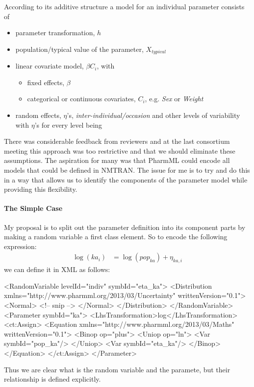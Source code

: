 \documentclass[a4paper,11pt]{article}
\newcommand{\pharmml}{PharmML\xspace}
\begin{document}
According to its additive structure a model for an individual parameter consists of
\begin{itemize}
\item
parameter transformation, $h$
\item
population/typical value of the parameter, $X_{typical}$
\item
linear covariate model, $\beta C_i$, with
\begin{itemize}
\item
fixed effects, $\beta$
\item
categorical or continuous covariates, $C_i$, e.g. \textit{Sex} or \textit{Weight}
\end{itemize}
\item
random effects, $\eta$'s, \textit{inter-individual/occasion} and other levels of variability with $\eta$'s for every level being 
\end{itemize}

There was considerable feedback from reviewers and at the last
consortium meeting this approach was too restrictive and that we
should eliminate these assumptions. The aspiration for many was that
\pharmml could encode all models that could be defined in NMTRAN. The
issue for me is to try and do this in a way that allows us to identify
the components of the parameter model while providing this
flexibility.

\paragraph{The Simple Case}

My proposal is to split out the parameter definition into its
component parts by making a random variable a first class element. So
to encode the following expression:
%
\begin{align}
\log(ka_{i}) &=  \log(pop_{ka}) + \eta_{ka,i}
\end{align}
%
we can define it in XML as follows:
%
\begin{xmlcode}
<RandomVariable levelId="indiv" symbId="eta_ka">
    <Distribution xmlns="http://www.pharmml.org/2013/03/Uncertainty"
      writtenVersion="0.1">
        <Normal>
          <!-- snip -->
        </Normal>
    </Distribution>
</RandomVariable>
<Parameter symbId="ka">
    <LhsTransformation>log</LhsTransformation>
    <ct:Assign>
        <Equation xmlns="http://www.pharmml.org/2013/03/Maths" writtenVersion="0.1">
            <Binop op="plus">
                <Uniop op="ln">
                    <Var symbId="pop_ka"/>
                </Uniop>
                <Var symbId="eta_ka"/>
            </Binop>
        </Equation>
    </ct:Assign>
</Parameter>
\end{xmlcode}
%
Thus we are clear what is the random variable and the paramete, but their relationship is defined explicitly.
\end{document}
